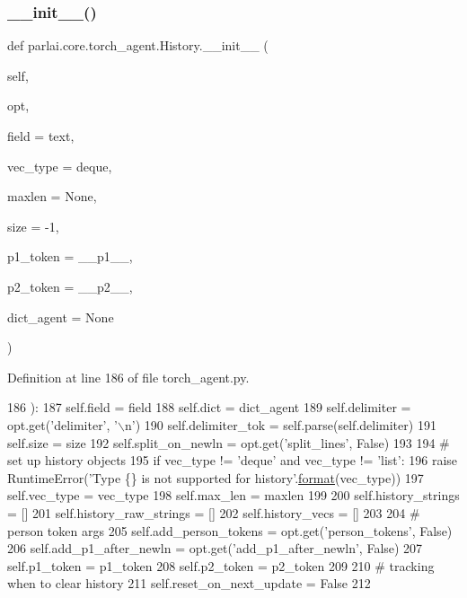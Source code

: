 \subsubsection{\texorpdfstring{\+\_\+\+\_\+init\+\_\+\+\_\+()}{\_\_init\_\_()}}
{\footnotesize\ttfamily def parlai.\+core.\+torch\+\_\+agent.\+History.\+\_\+\+\_\+init\+\_\+\+\_\+ (\begin{DoxyParamCaption}\item[{}]{self,  }\item[{}]{opt,  }\item[{}]{field = {\ttfamily \textquotesingle{}text\textquotesingle{}},  }\item[{}]{vec\+\_\+type = {\ttfamily \textquotesingle{}deque\textquotesingle{}},  }\item[{}]{maxlen = {\ttfamily None},  }\item[{}]{size = {\ttfamily -\/1},  }\item[{}]{p1\+\_\+token = {\ttfamily \textquotesingle{}\+\_\+\+\_\+p1\+\_\+\+\_\+\textquotesingle{}},  }\item[{}]{p2\+\_\+token = {\ttfamily \textquotesingle{}\+\_\+\+\_\+p2\+\_\+\+\_\+\textquotesingle{}},  }\item[{}]{dict\+\_\+agent = {\ttfamily None} }\end{DoxyParamCaption})}



Definition at line 186 of file torch\+\_\+agent.\+py.


\begin{DoxyCode}
186     ):
187         self.field = field
188         self.dict = dict\_agent
189         self.delimiter = opt.get(\textcolor{stringliteral}{'delimiter'}, \textcolor{stringliteral}{'\(\backslash\)n'})
190         self.delimiter\_tok = self.parse(self.delimiter)
191         self.size = size
192         self.split\_on\_newln = opt.get(\textcolor{stringliteral}{'split\_lines'}, \textcolor{keyword}{False})
193 
194         \textcolor{comment}{# set up history objects}
195         \textcolor{keywordflow}{if} vec\_type != \textcolor{stringliteral}{'deque'} \textcolor{keywordflow}{and} vec\_type != \textcolor{stringliteral}{'list'}:
196             \textcolor{keywordflow}{raise} RuntimeError(\textcolor{stringliteral}{'Type \{\} is not supported for history'}.\hyperlink{namespaceparlai_1_1chat__service_1_1services_1_1messenger_1_1shared__utils_a32e2e2022b824fbaf80c747160b52a76}{format}(vec\_type))
197         self.vec\_type = vec\_type
198         self.max\_len = maxlen
199 
200         self.history\_strings = []
201         self.history\_raw\_strings = []
202         self.history\_vecs = []
203 
204         \textcolor{comment}{# person token args}
205         self.add\_person\_tokens = opt.get(\textcolor{stringliteral}{'person\_tokens'}, \textcolor{keyword}{False})
206         self.add\_p1\_after\_newln = opt.get(\textcolor{stringliteral}{'add\_p1\_after\_newln'}, \textcolor{keyword}{False})
207         self.p1\_token = p1\_token
208         self.p2\_token = p2\_token
209 
210         \textcolor{comment}{# tracking when to clear history}
211         self.reset\_on\_next\_update = \textcolor{keyword}{False}
212 
\end{DoxyCode}


